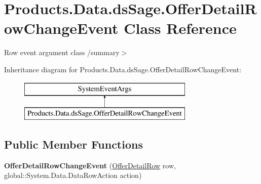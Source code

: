 \hypertarget{class_products_1_1_data_1_1ds_sage_1_1_offer_detail_row_change_event}{}\section{Products.\+Data.\+ds\+Sage.\+Offer\+Detail\+Row\+Change\+Event Class Reference}
\label{class_products_1_1_data_1_1ds_sage_1_1_offer_detail_row_change_event}


Row event argument class /summary$>$  


Inheritance diagram for Products.\+Data.\+ds\+Sage.\+Offer\+Detail\+Row\+Change\+Event\+:\begin{figure}[H]
\begin{center}
\leavevmode
\includegraphics[height=2.000000cm]{class_products_1_1_data_1_1ds_sage_1_1_offer_detail_row_change_event}
\end{center}
\end{figure}
\subsection*{Public Member Functions}
\begin{DoxyCompactItemize}
\item 
{\bfseries Offer\+Detail\+Row\+Change\+Event} (\hyperlink{class_products_1_1_data_1_1ds_sage_1_1_offer_detail_row}{Offer\+Detail\+Row} row, global\+::\+System.\+Data.\+Data\+Row\+Action action)\hypertarget{class_products_1_1_data_1_1ds_sage_1_1_offer_detail_row_change_event_ae164a90674e5aa41362347bbb70867c0}{}\label{class_products_1_1_data_1_1ds_sage_1_1_offer_detail_row_change_event_ae164a90674e5aa41362347bbb70867c0}

\end{DoxyCompactItemize}
